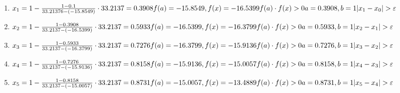 \documentclass{article}
\begin{document}
\begin{enumerate}[label= итерация \arabic{*}:]
  \item
\begin{math}
  x_{1}=1 - \frac{1-0.1}{33.21376-(-15.8549)} \cdot
  33.2137=0.3908\\
  f(a) = -15.8549, f(x)=-16.5399\\
  f(a) \cdot f(x) >0 \\
  a=0.3908, b=1\\
  |x_{1} - x_{0}| > \varepsilon \\ 
\end{math}

  \item
  \begin{math}
    x_{2}=1 -
    \frac{1-0.3908}{33.2137-(-16.5399)} \cdot
    33.2137=0.5933\\
    f(a) = -16.5399, f(x)=-16.3799\\
    f(a) \cdot f(x) >0 \\
    a=0.5933, b=1\\
    |x_{2} - x_{1}| > \varepsilon \\ 
  \end{math}
   
  \item
\begin{math}
  x_{3}=1 -
  \frac{1-0.5933}{33.2137-(-16.3799)} \cdot 33.2137=0.7276\\
  f(a) = -16.3799, f(x)=-15.9136\\
  f(a) \cdot f(x) >0 \\
  a=0.7276, b=1\\
  |x_{3} - x_{2}| > \varepsilon \\ 
\end{math}
 
  \item 
 \begin{math}
  x_{4}=1 - \frac{1-0.7276}{33.2137-(-15.9136)}
  \cdot 33.2137=0.8158\\
  f(a) = -15.9136, f(x)=-15.0057\\
  f(a) \cdot f(x) >0 \\
  a=0.8158, b=1\\
  |x_{4} - x_{3}| > \varepsilon \\ 
\end{math}

  \item 
\begin{math}
  x_{5}=1 -
  \frac{1-0.8158}{33.2137-(-15.0057)} \cdot 33.2137=0.8731\\
  f(a) = -15.0057, f(x)=-13.4889\\
  f(a) \cdot f(x) >0 \\
  a=0.8731, b=1\\
  |x_{5} - x_{4}| > \varepsilon \\ 
\end{math}
  

\end{enumerate}
\end{document}
